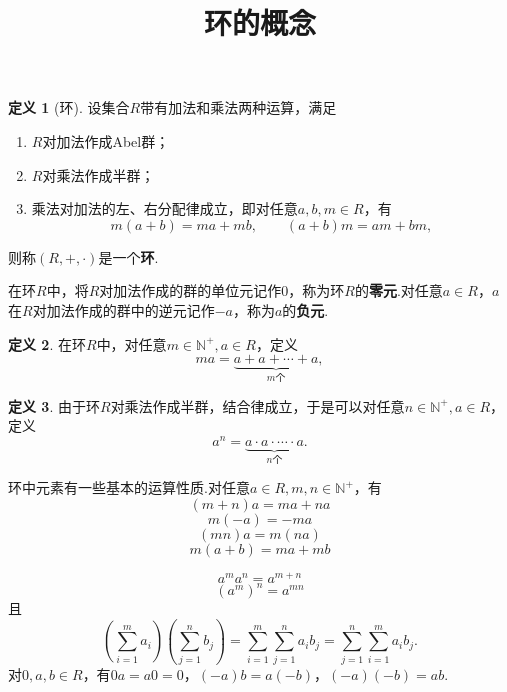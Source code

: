 \documentclass[12pt]{ctexart}
\title{\vspace{-2em}\textbf{环的概念}\vspace{-2em}}
\date{ }
\theoremstyle{definition}
\newtheorem{definition}{定义}
\theoremstyle{plain}
\begin{document}
	\maketitle
	\begin{definition}[环]
		设集合$R$带有加法和乘法两种运算，满足
		\begin{enumerate}
			\item $R$对加法作成Abel群；
			\item $R$对乘法作成半群；
			\item 乘法对加法的左、右分配律成立，即对任意$a,b,m\in R$，有
			$$m(a+b)=ma+mb,\qquad (a+b)m=am+bm,$$
		\end{enumerate}
		则称$(R,+,\cdot)$是一个\textbf{环}.
	\end{definition}
	在环$R$中，将$R$对加法作成的群的单位元记作$0$，称为环$R$的\textbf{零元}.对任意$a\in R$，$a$在$R$对加法作成的群中的逆元记作$-a$，称为$a$的\textbf{负元}.
	\begin{definition}
		在环$R$中，对任意$m\in\mathbb{N}^+,a\in R$，定义
		$$ma=\underbrace{a+a+\cdots+a}_{m\text{个}},$$
	\end{definition}
	\begin{definition}
		由于环$R$对乘法作成半群，结合律成立，于是可以对任意$n\in\mathbb{N}^+,a\in R$，定义
	$$a^n=\underbrace{a\cdot a\cdot\cdots\cdot a}_{n\text{个}}.$$
	\end{definition}
	环中元素有一些基本的运算性质.对任意$a\in R,m,n\in\mathbb{N}^+$，有
	$$(m+n)a=ma+na$$
	$$m(-a)=-ma$$
	$$(mn)a=m(na)$$
	$$m(a+b)=ma+mb$$
	
	$$a^ma^n=a^{m+n}$$
	$$(a^m)^n=a^{mn}$$
	且
	$$\left(\sum_{i=1}^{m}a_i\right)\left(\sum_{j=1}^{n}b_j\right)=\sum_{i=1}^{m}\sum_{j=1}^{n}a_ib_j=\sum_{j=1}^{n}\sum_{i=1}^{m}a_ib_j.$$
	对$0,a,b\in R$，有$0a=a0=0$，$(-a)b=a(-b)$，$(-a)(-b)=ab$.
	
\end{document}
